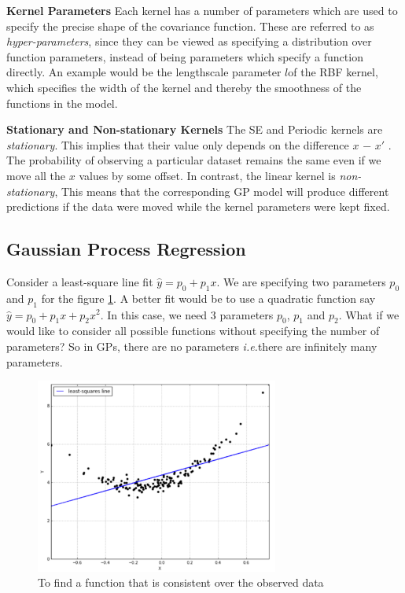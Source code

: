 \documentclass[12pt]{report}
\newcommand{\ie}{\textit{i.e.}}
\begin{document}
\cite{rasmussen2003gaussian}

\textbf{Kernel Parameters} Each kernel has a number of parameters which are used to specify the precise shape of the covariance function. These are referred to as \textit{hyper-parameters}, since they can be viewed as specifying a distribution over function parameters, instead of being parameters which specify a function directly. 
An example would be the lengthscale parameter $l$of the RBF kernel, which specifies the width of the kernel and thereby the smoothness of the functions in the model.

\textbf{Stationary and Non-stationary Kernels} The SE and Periodic kernels are \textit{stationary}. This implies that their value only depends on the difference $x$ − $x'$ . The probability of observing a particular dataset remains the same even if we move all the $x$ values by some offset. In contrast, the linear kernel is \textit{non-stationary}, This means that the corresponding GP model will produce different predictions if the data were moved while the kernel parameters were kept fixed.

\subsection{Gaussian Process Regression}
\label{GPR}
Consider a least-square line fit  $\hat{y} = p_0 + p_1x$. We are specifying two parameters $p_0$ and $p_1$ for the figure \ref{fig:lease_square}. A better fit would be to use a quadratic function say $\hat{y} = p_0 + p_1x + p_2x^2$. In this case, we need $3$ parameters $p_0$, $p_1$ and $p_2$. What if we would like to consider all possible functions without specifying the number of parameters? So in GPs, there are no parameters \ie there are infinitely many parameters. \par
\begin{figure}[htp]
	\centering 
	\includegraphics[width=8cm]{ls_fit.pdf}
	\caption{To find a function that is consistent over the observed data}
   \label{fig:lease_square}
\end{figure}
\end{document}
